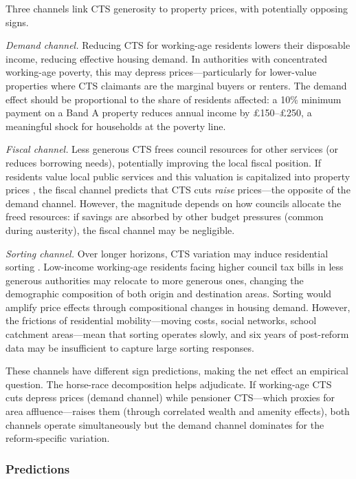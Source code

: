 \documentclass[12pt]{article}
\begin{document}
Three channels link CTS generosity to property prices, with potentially opposing signs.

\textit{Demand channel.} Reducing CTS for working-age residents lowers their disposable income, reducing effective housing demand. In authorities with concentrated working-age poverty, this may depress prices---particularly for lower-value properties where CTS claimants are the marginal buyers or renters. The demand effect should be proportional to the share of residents affected: a 10\% minimum payment on a Band A property reduces annual income by \pounds150--\pounds250, a meaningful shock for households at the poverty line.

\textit{Fiscal channel.} Less generous CTS frees council resources for other services (or reduces borrowing needs), potentially improving the local fiscal position. If residents value local public services and this valuation is capitalized into property prices \citep{oates1969, bayer2007}, the fiscal channel predicts that CTS cuts \textit{raise} prices---the opposite of the demand channel. However, the magnitude depends on how councils allocate the freed resources: if savings are absorbed by other budget pressures (common during austerity), the fiscal channel may be negligible.

\textit{Sorting channel.} Over longer horizons, CTS variation may induce residential sorting \citep{tiebout1956, figlio2004}. Low-income working-age residents facing higher council tax bills in less generous authorities may relocate to more generous ones, changing the demographic composition of both origin and destination areas. Sorting would amplify price effects through compositional changes in housing demand. However, the frictions of residential mobility---moving costs, social networks, school catchment areas---mean that sorting operates slowly, and six years of post-reform data may be insufficient to capture large sorting responses.

These channels have different sign predictions, making the net effect an empirical question. The horse-race decomposition helps adjudicate. If working-age CTS cuts depress prices (demand channel) while pensioner CTS---which proxies for area affluence---raises them (through correlated wealth and amenity effects), both channels operate simultaneously but the demand channel dominates for the reform-specific variation.

\subsubsection{Predictions}
\end{document}
